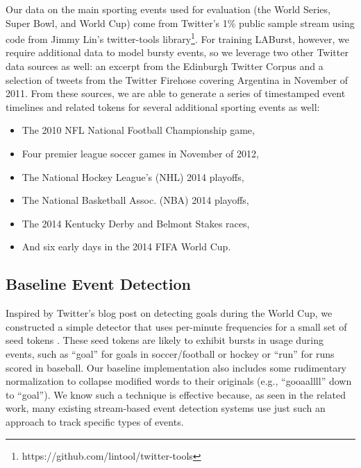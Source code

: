 \documentclass{sig-alternate}
\begin{document}
Our data on the main sporting events used for evaluation (the World Series, Super Bowl, and World Cup) come from Twitter's 1\% public sample stream using code from Jimmy Lin's twitter-tools library\footnote{https://github.com/lintool/twitter-tools}.
For training LABurst, however, we require additional data to model bursty events, so we leverage two other Twitter data sources as well: an excerpt from the Edinburgh Twitter Corpus \cite{Petrovic:2010:ETC:1860667.1860680} and a selection of tweets from the Twitter Firehose covering Argentina in November of 2011.
From these sources, we are able to generate a series of timestamped event timelines and related tokens for several additional sporting events as well: %
%
\begin{itemize} 
\item The 2010 NFL National Football Championship game, 
\item Four premier league soccer games in November of 2012, %
\item The National Hockey League's (NHL) 2014 playoffs, 
\item The National Basketball Assoc. (NBA) 2014 playoffs, 
\item The 2014 Kentucky Derby and Belmont Stakes races, 
\item And six early days in the 2014 FIFA World Cup.
\end{itemize}

\subsection{Baseline Event Detection}

Inspired by Twitter's blog post on detecting goals during the World Cup, we constructed a simple detector that uses per-minute frequencies for a small set of seed tokens \cite{Cipriani2014}. 
These seed tokens are likely to exhibit bursts in usage during events, such as ``goal'' for goals in soccer/football or hockey or ``run'' for runs scored in baseball.
Our baseline implementation also includes some rudimentary normalization to collapse modified words to their originals (e.g., ``gooaallll'' down to ``goal'').
We know such a technique is effective because, as seen in the related work, many existing stream-based event detection systems use just such an approach to track specific types of events.
\end{document}
